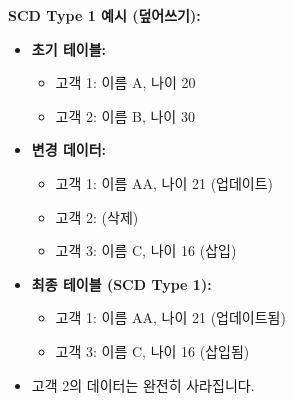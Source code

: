 \documentclass[11pt,a4paper]{article}
\begin{document}
\begin{examplebox}
\textbf{SCD Type 1 예시 (덮어쓰기):}
\begin{itemize}
    \item \textbf{초기 테이블:}
        \begin{itemize}
            \item 고객 1: 이름 A, 나이 20
            \item 고객 2: 이름 B, 나이 30
        \end{itemize}
    \item \textbf{변경 데이터:}
        \begin{itemize}
            \item 고객 1: 이름 AA, 나이 21 (업데이트)
            \item 고객 2: (삭제)
            \item 고객 3: 이름 C, 나이 16 (삽입)
        \end{itemize}
    \item \textbf{최종 테이블 (SCD Type 1):}
        \begin{itemize}
            \item 고객 1: 이름 AA, 나이 21 (업데이트됨)
            \item 고객 3: 이름 C, 나이 16 (삽입됨)
        \end{itemize}
    \item 고객 2의 데이터는 완전히 사라집니다.
\end{itemize}


\end{examplebox}
\end{document}
